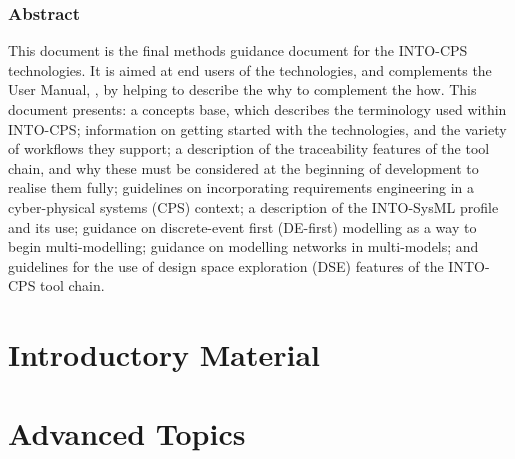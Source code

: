 \documentclass[narrowmargin,final,12pt,a4paper]{include/intocpsassociationlarge}   %
\begin{document}
\maketitle


\section*{Abstract}
\label{sec:abstract}

This document is the final methods guidance document for the INTO-CPS technologies. It is aimed at end users of the technologies, and complements the User Manual, \cite{Larsen&18a}, by helping to describe the why to complement the how. This document presents: a concepts base, which describes the terminology used within INTO-CPS; information on getting started with the technologies, and the variety of workflows they support; a description of the traceability features of the tool chain, and why these must be considered at the beginning of development to realise them fully; guidelines on incorporating requirements engineering in a cyber-physical systems (CPS) context; a description of the INTO-SysML profile and its use; guidance on discrete-event first (DE-first) modelling as a way to begin multi-modelling; guidance on modelling networks in multi-models; and guidelines for the use of design space exploration (DSE) features of the INTO-CPS tool chain.

\newpage

\tableofcontents
\newpage

\part{Introductory Material}
\label{part:intro}





\part{Advanced Topics}
\label{part:advanced}









\newpage


\label{ch:bib} %
\end{document}
